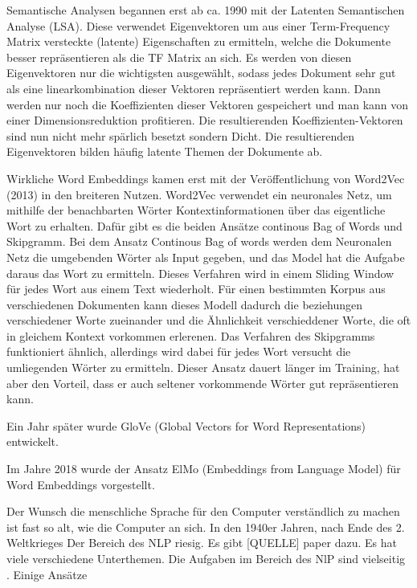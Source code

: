Semantische Analysen begannen erst ab ca. 1990 mit der Latenten Semantischen Analyse (LSA).
Diese verwendet Eigenvektoren um aus einer Term-Frequency Matrix versteckte (latente) Eigenschaften zu ermitteln, welche die Dokumente besser repräsentieren als die TF Matrix an sich. 
Es werden von diesen Eigenvektoren nur die wichtigsten ausgewählt, sodass jedes Dokument sehr gut als eine linearkombination dieser Vektoren repräsentiert werden kann.
Dann werden nur noch die Koeffizienten dieser Vektoren gespeichert und man kann von einer Dimensionsreduktion profitieren.
Die resultierenden Koeffizienten-Vektoren sind nun nicht mehr spärlich besetzt sondern Dicht.
Die resultierenden Eigenvektoren bilden häufig latente Themen der Dokumente ab.

Wirkliche Word Embeddings kamen erst mit der Veröffentlichung von Word2Vec (2013) in den breiteren Nutzen. 
Word2Vec verwendet ein neuronales Netz, um mithilfe der benachbarten Wörter Kontextinformationen über das eigentliche Wort zu erhalten. 
Dafür gibt es die beiden Ansätze continous Bag of Words und Skipgramm.
Bei dem Ansatz Continous Bag of words werden dem Neuronalen Netz die umgebenden Wörter als Input gegeben, und das Model hat die Aufgabe daraus das Wort zu ermitteln. 
Dieses Verfahren wird in einem Sliding Window für jedes Wort aus einem Text wiederholt. 
Für einen bestimmten Korpus aus verschiedenen Dokumenten kann dieses Modell dadurch die beziehungen verschiedener Worte zueinander und die Ähnlichkeit verschieddener Worte, die oft in gleichem Kontext vorkommen erlerenen. 
Das Verfahren des Skipgramms funktioniert ähnlich, allerdings wird dabei für jedes Wort versucht die umliegenden Wörter zu ermitteln. 
Dieser Ansatz dauert länger im Training, hat aber den Vorteil, dass er auch seltener vorkommende Wörter gut repräsentieren kann.

Ein Jahr später wurde GloVe (Global Vectors for Word Representations) entwickelt. 

Im Jahre 2018 wurde der Ansatz ElMo (Embeddings from Language Model) für Word Embeddings vorgestellt.










Der Wunsch die menschliche Sprache für den Computer verständlich zu machen ist fast so alt, wie die Computer an sich. 
In den 1940er Jahren, nach Ende des 2. Weltkrieges 
Der Bereich des NLP riesig. 
Es gibt [QUELLE] paper dazu. 
Es hat viele verschiedene Unterthemen. 
Die Aufgaben im Bereich des NlP sind vielseitig . Einige Ansätze 

